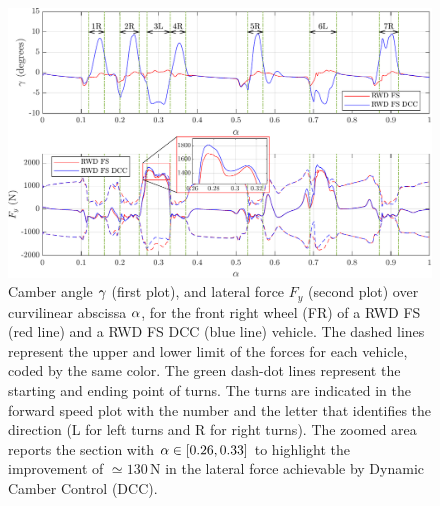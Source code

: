 \begin{figure}[h]
	\centering
	\includegraphics[scale = .8]{Images/DrivingStyles/rwdfs_rwdfsdcc_gammaFyFR.pdf}
	\caption{Camber angle $\gamma$ (first plot), and lateral force $F_y$ (second plot) over curvilinear abscissa $\alpha$, for the front right wheel (FR) of a RWD FS (red line) and a RWD FS DCC (blue line) vehicle. The dashed lines represent the upper and lower limit of the forces for each vehicle, coded by the same color. The green dash-dot lines represent the starting and ending point of turns. The turns are indicated in the forward speed plot with the number and the letter that identifies the direction (L for left turns and R for right turns). The zoomed area reports the section with $\alpha\in [0.26, 0.33]$ to highlight the improvement of $\simeq 130$\,N in the lateral force achievable by Dynamic Camber Control (DCC).}
	\label{fig:rwdfs_rwdfsdcc_gammaFyFR}
\end{figure}

